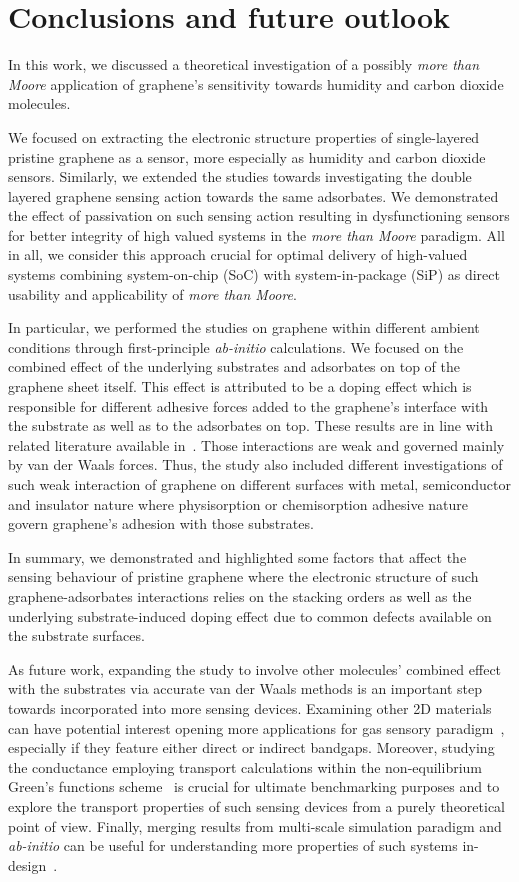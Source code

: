 \chapter{Conclusions and future outlook} 
In this work, we discussed a theoretical investigation of a possibly \textit{more than Moore} application of graphene's sensitivity towards humidity and carbon dioxide molecules. 

We focused on extracting the electronic structure properties of single-layered pristine graphene as a sensor, more especially as humidity and carbon dioxide sensors. Similarly, we extended the studies towards investigating the double layered graphene sensing action towards the same adsorbates. We demonstrated the effect of passivation on such sensing action resulting in dysfunctioning sensors for better integrity of high valued systems in the \textit{more than Moore} paradigm. All in all, we consider this approach crucial for optimal delivery of high-valued systems combining system-on-chip (SoC) with system-in-package (SiP) as direct usability and applicability of \textit{more than Moore}.

In particular, we performed the studies on graphene within different ambient conditions through first-principle \textit{ab-initio} calculations. We focused on the combined effect of the underlying substrates and adsorbates on top of the graphene sheet itself. This effect is attributed to be a doping effect which is responsible for different adhesive forces added to the graphene's interface with the substrate as well as to the adsorbates on top. These results are in line with related literature available in~\cite{Wehling2008, Liu2008, Levesque2011, Anton2012, Hong2016, Ashraf2016, Melios2017}. Those interactions are weak and governed mainly by van der Waals forces. Thus, the study also included different investigations of such weak interaction of graphene on different surfaces with metal, semiconductor and insulator nature where physisorption or chemisorption adhesive nature govern graphene's adhesion with those substrates. 

In summary, we demonstrated and highlighted some factors that affect the sensing behaviour of pristine graphene where the electronic structure of such graphene-adsorbates interactions relies on the stacking orders as well as the underlying substrate-induced doping effect due to common defects available on the substrate surfaces. 

As future work, expanding the study to involve other molecules' combined effect with the substrates via accurate van der Waals methods is an important step towards incorporated into more sensing devices. Examining other 2D materials can have potential interest opening more applications for gas sensory paradigm~\cite{Yue2013, Zhao2014}, especially if they feature either direct or indirect bandgaps. Moreover, studying the conductance employing transport calculations within the non-equilibrium Green's functions scheme~\cite{DattaAtomstotransistors} is crucial for ultimate benchmarking purposes and to explore the transport properties of such sensing devices from a purely theoretical point of view. Finally, merging results from multi-scale simulation paradigm and \textit{ab-initio} can be useful for understanding more properties of such systems in-design~\cite{fiori}.
\endinput